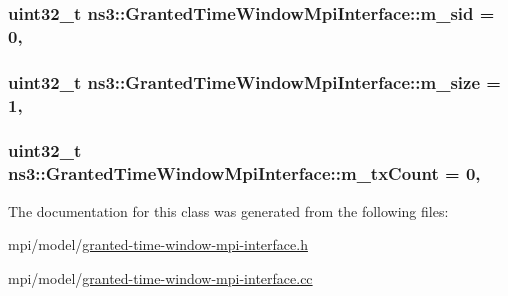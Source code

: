 \subsubsection[{\texorpdfstring{m\+\_\+sid}{m_sid}}]{\setlength{\rightskip}{0pt plus 5cm}uint32\+\_\+t ns3\+::\+Granted\+Time\+Window\+Mpi\+Interface\+::m\+\_\+sid = 0\hspace{0.3cm}{\ttfamily [static]}, {\ttfamily [private]}}\hypertarget{classns3_1_1GrantedTimeWindowMpiInterface_a44f846e917be914a4cdb2f6163ff974c}{}\label{classns3_1_1GrantedTimeWindowMpiInterface_a44f846e917be914a4cdb2f6163ff974c}
\subsubsection[{\texorpdfstring{m\+\_\+size}{m_size}}]{\setlength{\rightskip}{0pt plus 5cm}uint32\+\_\+t ns3\+::\+Granted\+Time\+Window\+Mpi\+Interface\+::m\+\_\+size = 1\hspace{0.3cm}{\ttfamily [static]}, {\ttfamily [private]}}\hypertarget{classns3_1_1GrantedTimeWindowMpiInterface_a22f9b74660dac51a833c12e2a7ba8d88}{}\label{classns3_1_1GrantedTimeWindowMpiInterface_a22f9b74660dac51a833c12e2a7ba8d88}
\subsubsection[{\texorpdfstring{m\+\_\+tx\+Count}{m_txCount}}]{\setlength{\rightskip}{0pt plus 5cm}uint32\+\_\+t ns3\+::\+Granted\+Time\+Window\+Mpi\+Interface\+::m\+\_\+tx\+Count = 0\hspace{0.3cm}{\ttfamily [static]}, {\ttfamily [private]}}\hypertarget{classns3_1_1GrantedTimeWindowMpiInterface_a9a5af8c59f7ef88b328df8ea986124d8}{}\label{classns3_1_1GrantedTimeWindowMpiInterface_a9a5af8c59f7ef88b328df8ea986124d8}


The documentation for this class was generated from the following files\+:\begin{DoxyCompactItemize}
\item 
mpi/model/\hyperlink{granted-time-window-mpi-interface_8h}{granted-\/time-\/window-\/mpi-\/interface.\+h}\item 
mpi/model/\hyperlink{granted-time-window-mpi-interface_8cc}{granted-\/time-\/window-\/mpi-\/interface.\+cc}\end{DoxyCompactItemize}
